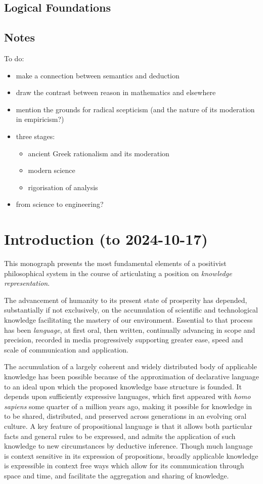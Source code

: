 \section{Logical Foundations}

\section{Notes}

To do:
\begin{itemize}
\item make a connection between semantics and deduction
\item draw the contrast between reason in mathematics and elsewhere
  \item mention the grounds for radical scepticism (and the nature of its moderation in empiricism?)
  \item three stages:
    \begin{itemize}
      \item
        ancient Greek rationalism and its moderation
      \item modern science
      \item rigorisation of analysis
    \end{itemize}
    \item from science to engineering?
\end{itemize}

\chapter{Introduction (to 2024-10-17)}

This monograph presents the most fundamental elements of a positivist philosophical system in the course of articulating a position on \emph{knowledge representation}.

The advancement of humanity to its present state of prosperity has depended, substantially if not exclusively, on the accumulation of scientific and technological knowledge facilitating the mastery of our environment.
Essential to that process has been \emph{language}, at first oral, then written, continually advancing in scope and precision, recorded in media progressively supporting greater ease, speed and scale of communication and application.

The accumulation of a largely coherent and widely distributed body of applicable knowledge has been possible because of the approximation of declarative language to an ideal upon which the proposed knowledge base structure is founded.
It depends upon sufficiently expressive languages, which first appeared with \emph{homo sapiens} some quarter of a million years ago, making it possible for knowledge in to be shared, distributed, and preserved across generations in an evolving oral culture.
A key feature of propositional language is that it allows both particular facts and general rules to be expressed, and admits the application of such knowledge to new circumstances by deductive inference.
Though much language is context sensitive in its expression of propositions, broadly applicable knowledge is expressible in context free ways which allow for its communication through space and time, and facilitate the aggregation and sharing of knowledge.

